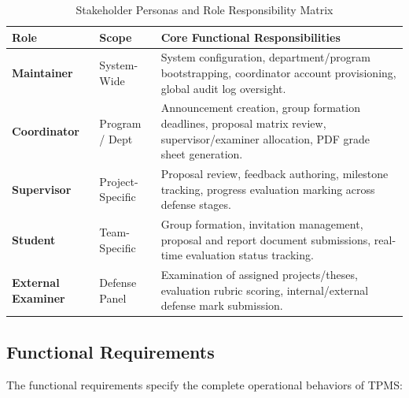 \begin{table}[H]
\centering
\small
\caption{Stakeholder Personas and Role Responsibility Matrix}
\label{tab:role_matrix}
\vspace{6pt}
\begin{tabularx}{\textwidth}{|l|l|X|}
\hline
\textbf{Role} & \textbf{Scope} & \textbf{Core Functional Responsibilities} \\
\hline
\textbf{Maintainer} & System-Wide & System configuration, department/program bootstrapping, coordinator account provisioning, global audit log oversight. \\
\hline
\textbf{Coordinator} & Program / Dept & Announcement creation, group formation deadlines, proposal matrix review, supervisor/examiner allocation, PDF grade sheet generation. \\
\hline
\textbf{Supervisor} & Project-Specific & Proposal review, feedback authoring, milestone tracking, progress evaluation marking across defense stages. \\
\hline
\textbf{Student} & Team-Specific & Group formation, invitation management, proposal and report document submissions, real-time evaluation status tracking. \\
\hline
\textbf{External Examiner} & Defense Panel & Examination of assigned projects/theses, evaluation rubric scoring, internal/external defense mark submission. \\
\hline
\end{tabularx}
\end{table}

\subsection{Functional Requirements}
The functional requirements specify the complete operational behaviors of TPMS:

